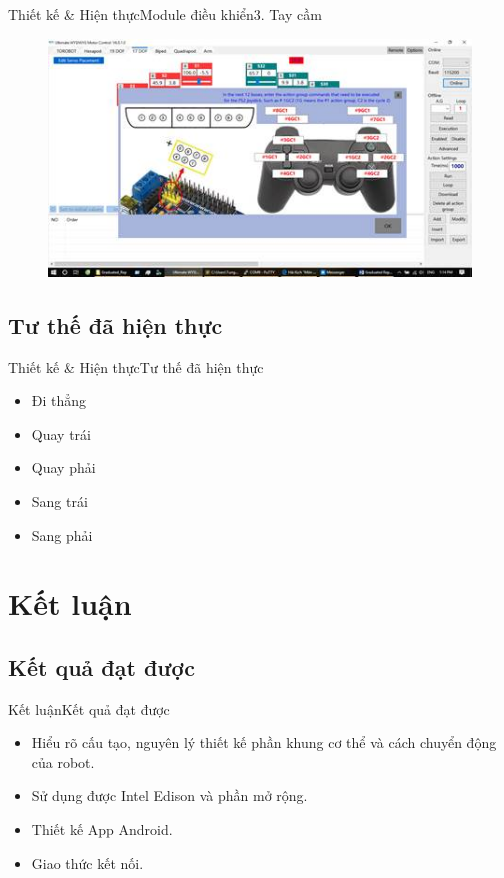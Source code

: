 \documentclass[compress, blue, 13pt,hyperref={pdfpagemode=FullScreen}]{beamer}
\begin{document}
\begin{frame}{Thiết kế \& Hiện thực}{Module điều khiển}{3. Tay cầm}
\transblindshorizontal
\begin{figure}[hbtp]
\centering
\includegraphics[scale=0.7]{images/image007.jpg}
\end{figure}
\end{frame}
%
\subsection{Tư thế đã hiện thực}
\begin{frame}{Thiết kế \& Hiện thực}{Tư thế đã hiện thực}
\transblindshorizontal
\begin{itemize}
\item Đi thẳng
\item Quay trái
\item Quay phải
\item Sang trái
\item Sang phải
\end{itemize}
\end{frame}
\section{Kết luận}
\subsection{Kết quả đạt được}
\begin{frame}{Kết luận}{Kết quả đạt được}
\transblindshorizontal
\begin{itemize}
\item Hiểu rõ cấu tạo, nguyên lý thiết kế phần khung cơ thể và cách chuyển động của robot.
\pause
\item Sử dụng được Intel Edison và phần mở rộng.
\pause
\item Thiết kế App Android.
\pause
\item Giao thức kết nối.
\end{itemize}
\end{frame}
\end{document}

